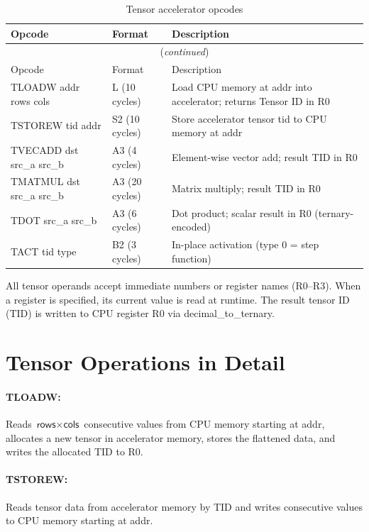 \documentclass[12pt,a4paper,twoside]{book}
\theoremstyle{trinarytheorem}
\theoremstyle{trinarydefinition}
\newcommand{\code}[1]{\textsf{#1}}
\begin{document}
\begin{longtable}{lll}
\caption{Tensor accelerator opcodes}
\label{tab:tensorlong} \\
\toprule
Opcode & Format & Description \\
\midrule
\endfirsthead
\multicolumn{3}{c}{(\emph{continued})} \\
\toprule
Opcode & Format & Description \\
\midrule
\endhead
\bottomrule
\endfoot
\code{TLOADW addr rows cols} & L (10 cycles) & Load CPU memory at \code{addr}
into accelerator; returns Tensor ID in R0 \\
\code{TSTOREW tid addr} & S2 (10 cycles) & Store accelerator tensor \code{tid}
to CPU memory at \code{addr} \\
\code{TVECADD dst src\_a src\_b} & A3 (4 cycles) & Element-wise vector add;
result TID in R0 \\
\code{TMATMUL dst src\_a src\_b} & A3 (20 cycles) & Matrix multiply;
result TID in R0 \\
\code{TDOT src\_a src\_b} & A3 (6 cycles) & Dot product; scalar result
in R0 (ternary-encoded) \\
\code{TACT tid type} & B2 (3 cycles) & In-place activation
(type 0 = step function) \\
\end{longtable}

All tensor operands accept immediate numbers or register names (R0--R3). When a
register is specified, its current value is read at runtime. The result tensor ID
(TID) is written to CPU register R0 via \code{decimal\_to\_ternary}.

\section{Tensor Operations in Detail}

\paragraph{TLOADW:} Reads $\code{rows} \times \code{cols}$ consecutive values from
CPU memory starting at \code{addr}, allocates a new tensor in accelerator memory,
stores the flattened data, and writes the allocated TID to R0.

\paragraph{TSTOREW:} Reads tensor data from accelerator memory by TID and writes
consecutive values to CPU memory starting at \code{addr}.
\end{document}
